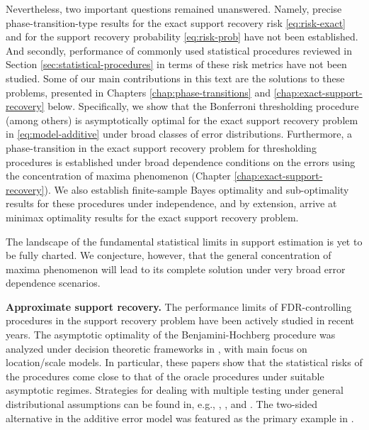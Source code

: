 Nevertheless, two important questions remained unanswered.
Namely, precise phase-transition-type results for the exact support recovery risk 
\eqref{eq:risk-exact} and for the support recovery probability \eqref{eq:risk-prob} 
have not been established.
And secondly, performance of commonly used statistical procedures reviewed in Section \ref{sec:statistical-procedures}
in terms of these risk metrics have not been studied.
Some of our main contributions in this text are the solutions to these problems, presented in Chapters \ref{chap:phase-transitions} and \ref{chap:exact-support-recovery} below. 
Specifically, we show that the Bonferroni thresholding procedure (among others) is asymptotically optimal for the exact support recovery problem in \eqref{eq:model-additive} under broad classes of error distributions. 
Furthermore, a phase-transition in the exact support recovery problem for thresholding procedures is established under broad dependence conditions on the errors using the concentration of maxima phenomenon (Chapter \ref{chap:exact-support-recovery}). 
We also establish finite-sample Bayes optimality and sub-optimality results for these procedures under independence, and by extension, arrive at minimax optimality results for the exact support recovery problem. 

The landscape of the fundamental statistical limits in support estimation is yet to be fully charted. 
We conjecture, however, that the general concentration of maxima phenomenon will lead to its complete solution under very broad error 
dependence scenarios.
\medskip

{\bf Approximate support recovery.}
The performance limits of FDR-controlling procedures in the support recovery problem have been actively studied in recent years.
The asymptotic optimality of the Benjamini-Hochberg procedure
was analyzed under decision theoretic frameworks in \cite{genovese2002operating, bogdan2011asymptotic, neuvial2012false}, with main focus on location/scale models. 
In particular, these papers show that the statistical risks of the procedures come close to that of the oracle procedures under suitable asymptotic regimes.
Strategies for dealing with multiple testing under general distributional assumptions can be found in, e.g., \cite{efron2004large}, \cite{storey2007optimal}, and \cite{sun2007oracle}.
The two-sided alternative in the additive error model was featured as the primary example in \cite{sun2007oracle}.

